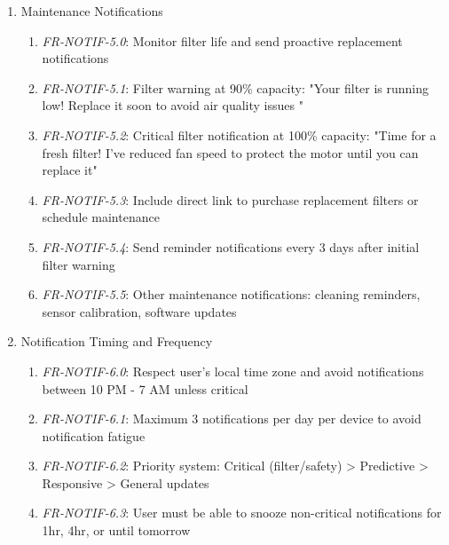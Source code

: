 \documentclass[conference]{IEEEtran}
\begin{document}
\begin{enumerate}
\begin{enumerate}
                            \item \textit{FR-NOTIF-4.5}: Include specific recommendations: window closure, room changes, device repositioning
                            \item \textit{FR-NOTIF-4.6}: Track prediction accuracy and adjust sensitivity thresholds based on user feedback
                        \end{enumerate}
                    \item Maintenance Notifications
                        \begin{enumerate}
                            \item \textit{FR-NOTIF-5.0}: Monitor filter life and send proactive replacement notifications
                            \item \textit{FR-NOTIF-5.1}: Filter warning at 90\% capacity: "Your filter is running low! Replace it soon to avoid air quality issues "
                            \item \textit{FR-NOTIF-5.2}: Critical filter notification at 100\% capacity: "Time for a fresh filter! I've reduced fan speed to protect the motor until you can replace it"
                            \item \textit{FR-NOTIF-5.3}: Include direct link to purchase replacement filters or schedule maintenance
                            \item \textit{FR-NOTIF-5.4}: Send reminder notifications every 3 days after initial filter warning
                            \item \textit{FR-NOTIF-5.5}: Other maintenance notifications: cleaning reminders, sensor calibration, software updates
                        \end{enumerate}
                    \item Notification Timing and Frequency
                        \begin{enumerate}
                            \item \textit{FR-NOTIF-6.0}: Respect user's local time zone and avoid notifications between 10 PM - 7 AM unless critical
                            \item \textit{FR-NOTIF-6.1}: Maximum 3 notifications per day per device to avoid notification fatigue
                            \item \textit{FR-NOTIF-6.2}: Priority system: Critical (filter/safety) >  Predictive > Responsive > General updates
                            \item \textit{FR-NOTIF-6.3}: User must be able to snooze non-critical notifications for 1hr, 4hr, or until tomorrow

\end{enumerate}
\end{enumerate}
\end{document}
